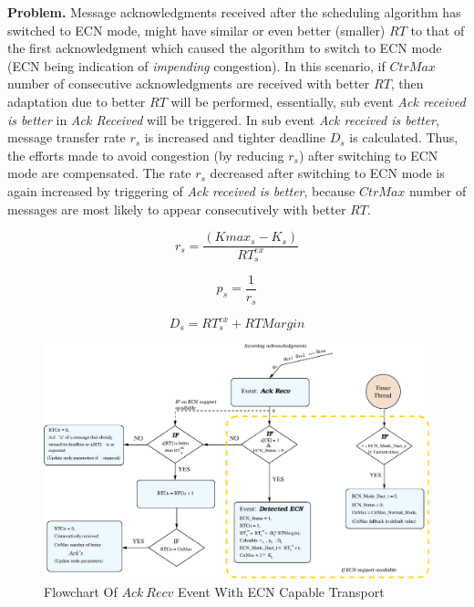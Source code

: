 {\bf Problem. }Message acknowledgments received after the scheduling algorithm has switched to ECN mode, might have similar or even better (smaller) $RT$ to that of the first acknowledgment which caused the algorithm to switch to ECN mode (ECN being indication of \textit{impending} congestion). In this scenario, if $CtrMax$ number of consecutive acknowledgments are received with better $RT$, then adaptation due to better $RT$ will be performed, essentially, sub event \textit{Ack received is better} in \textit{Ack Received} will be triggered. In sub event \textit{Ack received is better}, message transfer rate $r_s$ is increased and tighter deadline $D_s$ is calculated. Thus, the efforts made to avoid congestion (by reducing $r_s$) after switching to ECN mode are compensated. The rate $r_s$ decreased after switching to ECN mode is again increased by triggering of \textit{Ack received is better}, because $CtrMax$ number of messages are most likely to appear consecutively with better $RT$. 


\begin{equation}
r_s = \frac{(Kmax_s - K_s)}{RT_s^{ex}} 
\label{rate-eq}
\end{equation}	

\begin{equation}
p_s = \frac{1}{r_s}
\label{period-eq}
\end{equation}

\begin{equation}
D_s = RT_s^{ex} + RTMargin
\label{deadline-eq}
\end{equation}

\begin{figure}[htb]
  \begin{center}
    \includegraphics[scale=0.67]{Figures/iccps2014/ack_recv_flowchart.eps}
  \caption{Flowchart Of $Ack~Recv$ Event With ECN Capable Transport}
  \label{fig:ECN_flow}
  \end{center}
\end{figure}

